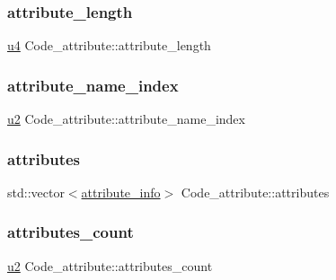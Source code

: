 \subsubsection{\texorpdfstring{attribute\+\_\+length}{attribute\_length}}
{\footnotesize\ttfamily \hyperlink{types_8h_af3b2d4b29fd9faedc984db3e062b3d5d}{u4} Code\+\_\+attribute\+::attribute\+\_\+length}

\mbox{\label{structCode__attribute_ad268ff5454f5b4cf9d6e158f28a00e3f}} 
\subsubsection{\texorpdfstring{attribute\+\_\+name\+\_\+index}{attribute\_name\_index}}
{\footnotesize\ttfamily \hyperlink{types_8h_ae676e9207f57fb921dca7366b2f59c53}{u2} Code\+\_\+attribute\+::attribute\+\_\+name\+\_\+index}

\mbox{\label{structCode__attribute_ab48e9f90b190463567fcc86737cbc5d2}} 
\subsubsection{\texorpdfstring{attributes}{attributes}}
{\footnotesize\ttfamily std\+::vector$<$\hyperlink{structattribute__info}{attribute\+\_\+info}$>$ Code\+\_\+attribute\+::attributes}

\mbox{\label{structCode__attribute_a9ca1435aa65ae02d764ff53a36fb842f}} 
\subsubsection{\texorpdfstring{attributes\+\_\+count}{attributes\_count}}
{\footnotesize\ttfamily \hyperlink{types_8h_ae676e9207f57fb921dca7366b2f59c53}{u2} Code\+\_\+attribute\+::attributes\+\_\+count}

